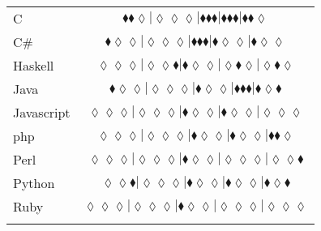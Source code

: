 \begin{table*}
{\begin{tabular}{l c}
C & $\scriptscriptstyle\blacklozenge\blacklozenge\lozenge|\lozenge\lozenge\lozenge|\blacklozenge\blacklozenge\blacklozenge|\blacklozenge\blacklozenge\blacklozenge|\blacklozenge\blacklozenge\lozenge$ \\
C\# & $\scriptscriptstyle\blacklozenge\lozenge\lozenge|\lozenge\lozenge\lozenge|\blacklozenge\blacklozenge\blacklozenge|\blacklozenge\lozenge\lozenge|\blacklozenge\lozenge\lozenge$ \\
Haskell & $\scriptscriptstyle\lozenge\lozenge\lozenge|\lozenge\lozenge\blacklozenge|\blacklozenge\lozenge\lozenge|\lozenge\blacklozenge\lozenge|\lozenge\blacklozenge\lozenge$ \\
Java & $\scriptscriptstyle\blacklozenge\lozenge\lozenge|\lozenge\lozenge\lozenge|\blacklozenge\lozenge\lozenge|\blacklozenge\blacklozenge\blacklozenge|\blacklozenge\lozenge\blacklozenge$ \\
Javascript & $\scriptscriptstyle\lozenge\lozenge\lozenge|\lozenge\lozenge\lozenge|\blacklozenge\lozenge\lozenge|\blacklozenge\lozenge\lozenge|\lozenge\lozenge\lozenge$ \\
{\sc php} & $\scriptscriptstyle\lozenge\lozenge\lozenge|\lozenge\lozenge\lozenge|\blacklozenge\lozenge\lozenge|\blacklozenge\lozenge\lozenge|\blacklozenge\blacklozenge\lozenge$ \\
Perl & $\scriptscriptstyle\lozenge\lozenge\lozenge|\lozenge\lozenge\lozenge|\blacklozenge\lozenge\lozenge|\lozenge\lozenge\lozenge|\lozenge\lozenge\blacklozenge$ \\
Python & $\scriptscriptstyle\lozenge\lozenge\blacklozenge|\lozenge\lozenge\lozenge|\blacklozenge\lozenge\lozenge|\blacklozenge\lozenge\lozenge|\blacklozenge\lozenge\blacklozenge$ \\
Ruby & $\scriptscriptstyle\lozenge\lozenge\lozenge|\lozenge\lozenge\lozenge|\blacklozenge\lozenge\lozenge|\lozenge\lozenge\lozenge|\lozenge\lozenge\lozenge$ \\

\hline
& \\
\end{tabular}
} 
\end{table*}
